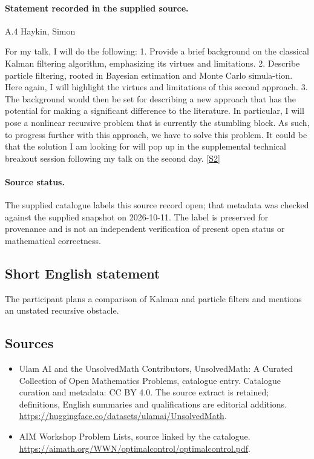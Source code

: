 \documentclass[11pt]{article}
\begin{document}
\paragraph{Statement recorded in the supplied source.}
A.4 Haykin, Simon

For my talk, I will do the following: 1. Provide a brief background on the classical Kalman filtering algorithm, emphasizing its virtues and limitations. 2. Describe particle filtering, rooted in Bayesian estimation and Monte Carlo simula-tion. Here again, I will highlight the virtues and limitations of this second approach. 3. The background would then be set for describing a new approach that has the potential for making a significant difference to the literature. In particular, I will pose a nonlinear recursive problem that is currently the stumbling block. As such, to progress further with this approach, we have to solve this problem. It could be that the solution I am looking for will pop up in the supplemental technical breakout session following my talk on the second day. \href{https://aimath.org/WWN/optimalcontrol/optimalcontrol.pdf}{[S2]}
\paragraph{Source status.}
The supplied catalogue labels this source record open; that metadata was checked against the supplied snapshot on 2026-10-11. The label is preserved for provenance and is not an independent verification of present open status or mathematical correctness.
\subsection{Short English statement}
The participant plans a comparison of Kalman and particle filters and mentions an unstated recursive obstacle.
\subsection{Sources}
\begin{itemize}
\item[S1] Ulam AI and the UnsolvedMath Contributors, UnsolvedMath: A Curated Collection of Open Mathematics Problems, catalogue entry. Catalogue curation and metadata: CC BY 4.0. The source extract is retained; definitions, English summaries and qualifications are editorial additions.
\url{https://huggingface.co/datasets/ulamai/UnsolvedMath}.
\item[S2] AIM Workshop Problem Lists, source linked by the catalogue.
\url{https://aimath.org/WWN/optimalcontrol/optimalcontrol.pdf}.
\end{itemize}
\end{document}
